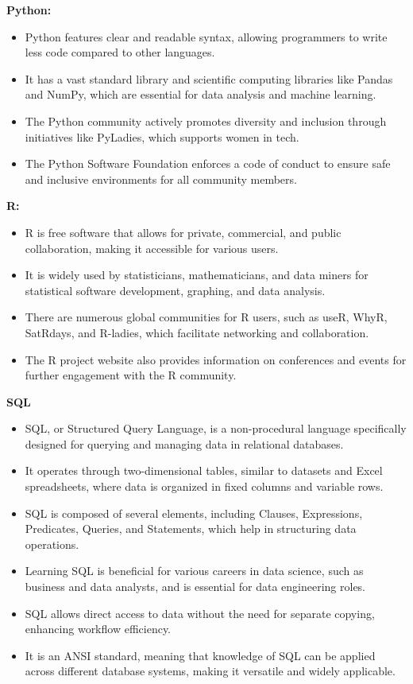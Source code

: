 \documentclass[12pt]{report} %
\begin{document}
		\noindent \textbf{Python:}
			\begin{itemize}
				\item Python features clear and readable syntax, allowing programmers to write less code compared to other languages.
				\item  It has a vast standard library and scientific computing libraries like Pandas and NumPy, which are essential for data analysis and machine learning.
				\item  The Python community actively promotes diversity and inclusion through initiatives like PyLadies, which supports women in tech.
				\item  The Python Software Foundation enforces a code of conduct to ensure safe and inclusive environments for all community members.
			\end{itemize}
			
	\noindent \textbf{R:}
		\begin{itemize}
			\item R is free software that allows for private, commercial, and public collaboration, making it accessible for various users.
			\item It is widely used by statisticians, mathematicians, and data miners for statistical software development, graphing, and data analysis.
			\item  There are numerous global communities for R users, such as useR, WhyR, SatRdays, and R-ladies, which facilitate networking and collaboration.
			\item  The R project website also provides information on conferences and events for further engagement with the R community.
		\end{itemize}
	
	\noindent \textbf{SQL}
		\begin{itemize}
			\item SQL, or Structured Query Language, is a non-procedural language specifically designed for querying and managing data in relational databases.
			\item It operates through two-dimensional tables, similar to datasets and Excel spreadsheets, where data is organized in fixed columns and variable rows.
			\item  SQL is composed of several elements, including Clauses, Expressions, Predicates, Queries, and Statements, which help in structuring data operations.
			\item  Learning SQL is beneficial for various careers in data science, such as business and data analysts, and is essential for data engineering roles.
			\item  SQL allows direct access to data without the need for separate copying, enhancing workflow efficiency.
			\item It is an ANSI standard, meaning that knowledge of SQL can be applied across different database systems, making it versatile and widely applicable.
		\end{itemize}
	
\end{document}

